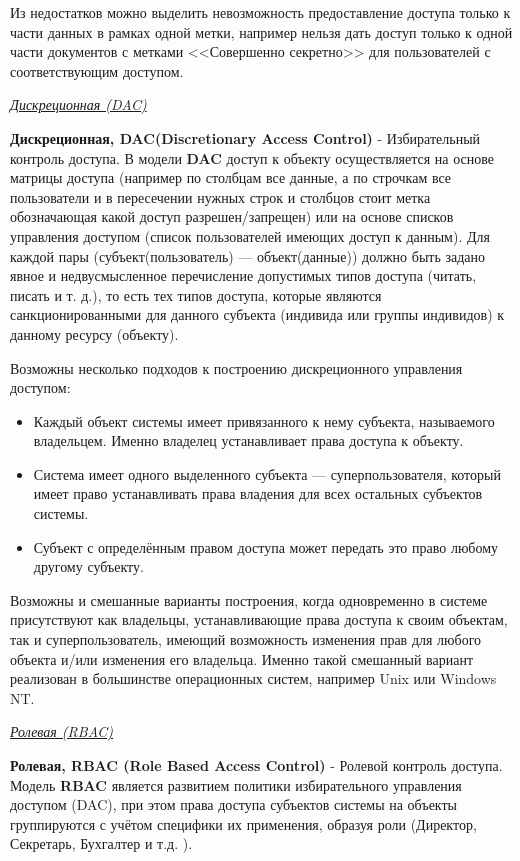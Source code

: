 Из недостатков можно выделить невозможность предоставление доступа только к части данных в рамках одной метки, например нельзя дать доступ только к одной части документов с метками <<Совершенно секретно>> для пользователей с соответствующим доступом.

\begin{center}
	\textit{\underline{Дискреционная (DAC)}}
\end{center}

\textbf{Дискреционная, DAC(Discretionary Access Control)} - Избирательный контроль доступа. В модели \textbf{DAC} доступ к объекту осуществляется на основе матрицы доступа (например по столбцам все данные, а по строчкам все пользователи и в пересечении нужных строк и столбцов стоит метка обозначающая какой доступ разрешен/запрещен) или на основе списков управления доступом (список пользователей имеющих доступ к данным). Для каждой пары (субъект(пользователь) — объект(данные)) должно быть задано явное и недвусмысленное перечисление допустимых типов доступа (читать, писать и т. д.), то есть тех типов доступа, которые являются санкционированными для данного субъекта (индивида или группы индивидов) к данному ресурсу (объекту).

Возможны несколько подходов к построению дискреционного управления доступом:
\begin{itemize}
\item Каждый объект системы имеет привязанного к нему субъекта, называемого владельцем. Именно владелец устанавливает права доступа к объекту.
\item Система имеет одного выделенного субъекта — суперпользователя, который имеет право устанавливать права владения для всех остальных субъектов системы.
\item Субъект с определённым правом доступа может передать это право любому другому субъекту.
\end{itemize}

Возможны и смешанные варианты построения, когда одновременно в системе присутствуют как владельцы, устанавливающие права доступа к своим объектам, так и суперпользователь, имеющий возможность изменения прав для любого объекта и/или изменения его владельца. Именно такой смешанный вариант реализован в большинстве операционных систем, например Unix или Windows NT.

\begin{center}
	\textit{\underline{Ролевая (RBAC)}}
\end{center}

\textbf{Ролевая, RBAC (Role Based Access Control)} - Ролевой контроль доступа. Модель \textbf{RBAC} является развитием политики избирательного управления доступом (DAC), при этом права доступа субъектов системы на объекты группируются с учётом специфики их применения, образуя роли (Директор, Секретарь, Бухгалтер и т.д. ).

